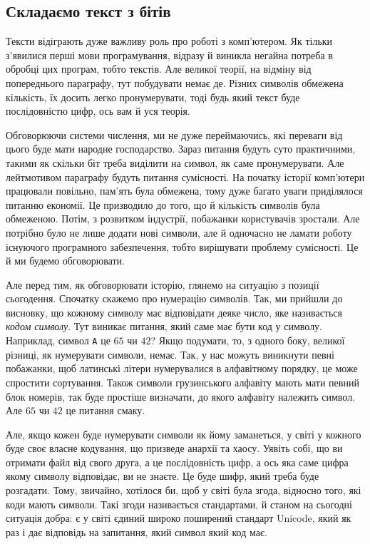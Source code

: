 \documentclass{book}
\newcommand{\bitstr}[1]{{\tt #1}}
\begin{document}
\subsection{Складаємо текст з бітів}

Тексти відіграють дуже важливу роль про роботі з комп'ютером.
Як тільки з'явилися перші мови програмування, відразу й виникла негайна потреба в обробці цих програм, тобто текстів.
Але великої теорії, на відміну від попереднього параграфу, тут побудувати немає де.
Різних символів обмежена кількість, їх досить легко пронумерувати, тоді будь який текст буде послідовністю цифр, ось вам й уся теорія.

Обговорюючи системи числення, ми не дуже переймаючись, які переваги від цього буде мати народне господарство.
Зараз питання будуть суто практичними, такими як скільки біт треба виділити на символ, як саме пронумерувати.
Але лейтмотивом параграфу будуть питання сумісності.
На початку історії комп'ютери працювали повільно, пам'ять була обмежена, тому дуже багато уваги приділялося питанню економії.
Це призводило до того, що й кількість символів була обмеженою.
Потім, з розвитком індустрії, побажанки користувачів зростали.
Але потрібно було не лише додати нові символи, але й одночасно не ламати роботу існуючого програмного забезпечення, тобто вирішувати проблему сумісності.
Це й ми будемо обговорювати.

Але перед тим, як обговорювати історію, глянемо на ситуацію з позиції сьогодення.
Спочатку скажемо про нумерацію символів.
Так, ми прийшли до висновку, що кожному символу має відповідати деяке число, яке називається \textit{кодом символу}.
Тут виникає питання, який саме має бути код у символу.
Наприклад, символ \bitstr{A} це $65$ чи $42$?
Якщо подумати, то, з одного боку, великої різниці, як нумерувати символи, немає.
Так, у нас можуть виникнути певні побажанки, щоб латинські літери нумерувалися в алфавітному порядку, це може спростити сортування.
Також символи грузинського алфавіту мають мати певний блок номерів, так буде простіше визначати, до якого алфавіту належить символ.
Але $65$ чи $42$ це питання смаку.

Але, якщо кожен буде нумерувати символи як йому заманеться, у світі у кожного буде своє власне кодування, що призведе анархії та хаосу.
Уявіть собі, що ви отримати файл від свого друга, а це послідовність цифр, а ось яка саме цифра якому символу відповідає, ви не знаєте.
Це буде шифр, який треба буде розгадати.
Тому, звичайно, хотілося би, щоб у світі була згода, відносно того, які коди мають символи.
Такі згоди називається стандартами, й станом на сьогодні ситуація добра: є у світі єдиний широко поширений стандарт Unicode, який як раз і дає відповідь на запитання, який символ який код має.
\end{document}
